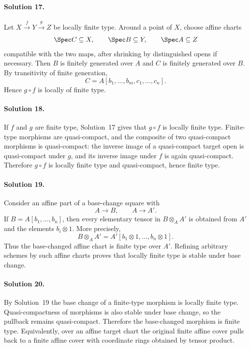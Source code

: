 \paragraph{Solution 17.}
Let \(X\xrightarrow f Y\xrightarrow g Z\) be locally finite type.  Around a point of \(X\), choose
affine charts
\[
\Spec C\subseteq X,\qquad \Spec B\subseteq Y,\qquad \Spec A\subseteq Z
\]
compatible with the two maps, after shrinking by distinguished opens if necessary.  Then
\(B\) is finitely generated over \(A\) and \(C\) is finitely generated over \(B\).  By transitivity
of finite generation,
\[
C=A[b_1,\ldots,b_m,c_1,\ldots,c_n].
\]
Hence \(g\circ f\) is locally of finite type.

\paragraph{Solution 18.}
If \(f\) and \(g\) are finite type, Solution~17 gives that \(g\circ f\) is locally finite type.
Finite-type morphisms are quasi-compact, and the composite of two quasi-compact morphisms is
quasi-compact: the inverse image of a quasi-compact target open is quasi-compact under \(g\), and
its inverse image under \(f\) is again quasi-compact.  Therefore \(g\circ f\) is locally finite type
and quasi-compact, hence finite type.

\paragraph{Solution 19.}
Consider an affine part of a base-change square with
\[
A\to B,\qquad A\to A'.
\]
If \(B=A[b_1,\ldots,b_n]\), then every elementary tensor in \(B\otimes_AA'\) is obtained from
\(A'\) and the elements \(b_i\otimes1\).  More precisely,
\[
B\otimes_AA'=A'[b_1\otimes1,\ldots,b_n\otimes1].
\]
Thus the base-changed affine chart is finite type over \(A'\).  Refining arbitrary schemes by such
affine charts proves that locally finite type is stable under base change.

\paragraph{Solution 20.}
By Solution~19 the base change of a finite-type morphism is locally finite type.  Quasi-compactness
of morphisms is also stable under base change, so the pullback remains quasi-compact.  Therefore the
base-changed morphism is finite type.  Equivalently, over an affine target chart the original
finite affine cover pulls back to a finite affine cover with coordinate rings obtained by tensor
product.

